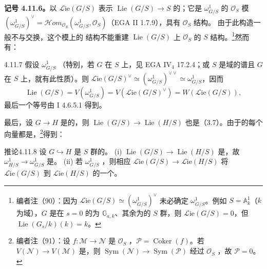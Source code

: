 \textbf{记号 4.11.6。}以 $\mathscr{L}\mathrm{ie}(G/S)$ 表示 $\operatorname{Lie}(G/S)\to S$ 的；它是 $\omega^1_{G/S}$ 的 $\mathcal O_S$ 模
$(\omega^1_{G/S})^\vee=\mathcal Hom_{\mathcal O_S}(\omega^1_{G/S},\mathcal O_S)$（EGA II 1.7.9），具有 $\mathcal O_S$ 结构。
由于此构造一般不与交换，这个模上的 结构不能重建 $\operatorname{Lie}(G/S)$ 上 $\mathcal O_S$ 的 $S$ 结构。\footnote{编者注（90）：因为 $\mathscr{L}\mathrm{ie}(G/S)\simeq(\omega^1_{G/S})^\vee$ 未必确定 $\omega^1_{G/S}$。例如 $S=\mathbb A^1_k$（$k$ 为域），$G$ 是在 $s=0$ 的为 $\mathbb G_{a,k}$、其余为的 $S$ 群，则 $\mathscr{L}\mathrm{ie}(G/S)=0$，但 $\operatorname{Lie}(G_s/k)(k)=k$。}然而有：
\begin{SGAresult}{}{4.11.7}
假设 $\omega^1_{G/S}$ （特别，若 $G$ 在 $S$ 上，见 EGA IV$_4$ 17.2.4；或 $S$ 是域的谱且 $G$ 在 $S$ 上，就有此性质）。则 $\mathscr{L}\mathrm{ie}(G/S)^\vee\simeq(\omega^1_{G/S})^{\vee\vee}\simeq\omega^1_{G/S}$，因而
\[\operatorname{Lie}(G/S)=V(\omega^1_{G/S})=V(\mathscr{L}\mathrm{ie}(G/S)^\vee)=W(\mathscr{L}\mathrm{ie}(G/S)),\]
最后一个等号由 I 4.6.5.1 得到。
\end{SGAresult}
最后，设 $G\to H$ 是的，则 $\operatorname{Lie}(G/S)\to\operatorname{Lie}(H/S)$ 也是（3.7）。由于的每个向量都是，\footnote{编者注（91）：设 $f:\mathcal M\to\mathcal N$ 是 $\mathcal O_S$ ，$\mathcal P=\operatorname{Coker}(f)$。若 $V(\mathcal N)\to V(\mathcal M)$ 是，则 $\operatorname{Sym}(\mathcal N)\to\operatorname{Sym}(\mathcal P)$ 经过 $\mathcal O_S$ ，故 $\mathcal P=0$。}得到：
\begin{SGAresult}{推论}{4.11.8}
设 $G\hookrightarrow H$ 是 $S$ 群的。
(i) $\operatorname{Lie}(G/S)\to\operatorname{Lie}(H/S)$ 是，故 $\omega^1_{H/S}\to\omega^1_{G/S}$ 是。
(ii) 若 $\omega^1_{G/S}$ ，则相应 $\mathscr{L}\mathrm{ie}(G/S)\to\mathscr{L}\mathrm{ie}(H/S)$ 将 $\mathscr{L}\mathrm{ie}(G/S)$ 到 $\mathscr{L}\mathrm{ie}(H/S)$ 的一个。
\end{SGAresult}
